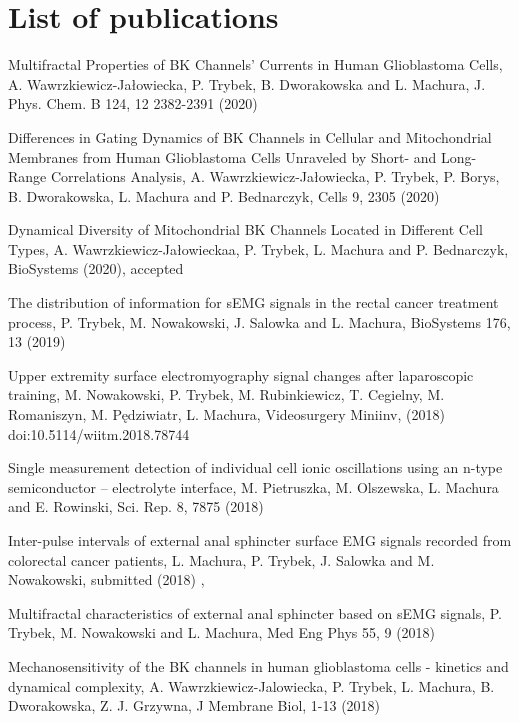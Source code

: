 \section{List of publications}
  \begin{etaremune}  %
  \item Multifractal Properties of BK Channels’ Currents in Human Glioblastoma Cells, A. Wawrzkiewicz-Jałowiecka, P. Trybek, B. Dworakowska and L. Machura, J. Phys. Chem. B 124,  12  2382-2391  (2020)

\item Differences in Gating Dynamics of BK Channels in Cellular and Mitochondrial Membranes from Human Glioblastoma Cells Unraveled by Short- and Long-Range Correlations Analysis, A. Wawrzkiewicz-Jałowiecka, P. Trybek, P. Borys, B. Dworakowska, L. Machura and P. Bednarczyk, Cells 9,  2305 (2020)

\item Dynamical Diversity of Mitochondrial BK Channels Located in Different Cell Types, A. Wawrzkiewicz-Jałowieckaa, P. Trybek, L. Machura and P. Bednarczyk, BioSystems (2020),  accepted 

\item The distribution of information for sEMG signals in the rectal cancer treatment process, P. Trybek, M. Nowakowski, J. Salowka and L. Machura, BioSystems 176,  13 (2019)

\item Upper extremity surface electromyography signal changes after laparoscopic training, M. Nowakowski, P. Trybek, M. Rubinkiewicz, T. Cegielny, M. Romaniszyn, M. Pędziwiatr, L. Machura, Videosurgery Miniinv,  (2018)  doi:10.5114/wiitm.2018.78744

\item Single measurement detection of individual cell ionic oscillations using an n-type semiconductor – electrolyte interface, M. Pietruszka, M. Olszewska, L. Machura and E. Rowinski, Sci. Rep. 8,  7875 (2018)

\item Inter-pulse intervals of external anal sphincter surface EMG signals recorded from colorectal cancer patients, L. Machura, P. Trybek, J. Salowka and M. Nowakowski, submitted (2018)
, 
\item Multifractal characteristics of external anal sphincter based on sEMG signals, P. Trybek, M. Nowakowski and L. Machura, Med Eng Phys 55,  9 (2018)

\item Mechanosensitivity of the BK channels in human glioblastoma cells - kinetics and dynamical complexity, A. Wawrzkiewicz-Jalowiecka, P. Trybek, L. Machura, B. Dworakowska, Z. J. Grzywna, J Membrane Biol,  1-13 (2018)


\end{etaremune}
